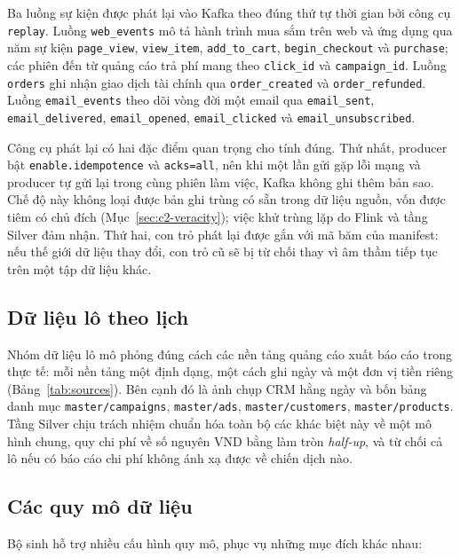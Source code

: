 Ba luồng sự kiện được phát lại vào Kafka theo đúng thứ tự thời gian bởi công cụ \texttt{replay}. Luồng \texttt{web\_events} mô tả hành trình mua sắm trên web và ứng dụng qua năm sự kiện \texttt{page\_view}, \texttt{view\_item}, \texttt{add\_to\_cart}, \texttt{begin\_checkout} và \texttt{purchase}; các phiên đến từ quảng cáo trả phí mang theo \texttt{click\_id} và \texttt{campaign\_id}. Luồng \texttt{orders} ghi nhận giao dịch tài chính qua \texttt{order\_created} và \texttt{order\_refunded}. Luồng \texttt{email\_events} theo dõi vòng đời một email qua \texttt{email\_sent}, \texttt{email\_delivered}, \texttt{email\_opened}, \texttt{email\_clicked} và \texttt{email\_unsubscribed}.

Công cụ phát lại có hai đặc điểm quan trọng cho tính đúng. Thứ nhất, producer bật \texttt{enable.idempotence} và \texttt{acks=all}, nên khi một lần gửi gặp lỗi mạng và producer tự gửi lại trong cùng phiên làm việc, Kafka không ghi thêm bản sao. Chế độ này không loại được bản ghi trùng có sẵn trong dữ liệu nguồn, vốn được tiêm có chủ đích (Mục~\ref{sec:c2-veracity}); việc khử trùng lặp do Flink và tầng Silver đảm nhận. Thứ hai, con trỏ phát lại được gắn với mã băm của manifest: nếu thế giới dữ liệu thay đổi, con trỏ cũ sẽ bị từ chối thay vì âm thầm tiếp tục trên một tập dữ liệu khác.

\subsection{Dữ liệu lô theo lịch}
\label{sec:c2-du-lieu-lo}

Nhóm dữ liệu lô mô phỏng đúng cách các nền tảng quảng cáo xuất báo cáo trong thực tế: mỗi nền tảng một định dạng, một cách ghi ngày và một đơn vị tiền riêng (Bảng~\ref{tab:sources}). Bên cạnh đó là ảnh chụp CRM hằng ngày và bốn bảng danh mục \texttt{master/campaigns}, \texttt{master/ads}, \texttt{master/customers}, \texttt{master/products}. Tầng Silver chịu trách nhiệm chuẩn hóa toàn bộ các khác biệt này về một mô hình chung, quy chi phí về số nguyên VND bằng làm tròn \emph{half-up}, và từ chối cả lô nếu có báo cáo chi phí không ánh xạ được về chiến dịch nào.

\subsection{Các quy mô dữ liệu}
\label{sec:c2-profiles}

Bộ sinh hỗ trợ nhiều cấu hình quy mô, phục vụ những mục đích khác nhau:

